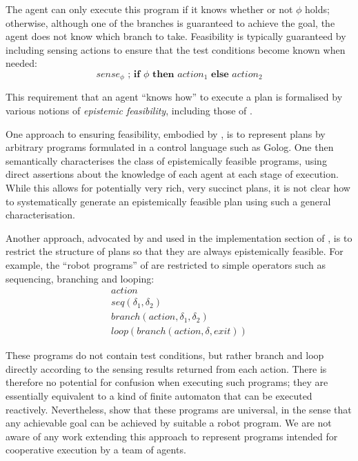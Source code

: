The agent can only execute this program if it knows whether or not
$\phi$ holds; otherwise, although one of the branches is guaranteed
to achieve the goal, the agent does not know which branch to take.
Feasibility is typically guaranteed by including sensing actions to
ensure that the test conditions become known when needed:\[
sense_{\phi}\,\,;\,\mathbf{if\,}\,\phi\,\,\mathbf{then}\,\, action_{1}\,\,\mathbf{else\,}\, action_{2}\]


This requirement that an agent {}``knows how'' to execute a plan
is formalised by various notions of \emph{epistemic feasibility},
including those of \citep{levesque98what_robots_can_do,levesque00knowing_how,Lesperance01epi_feas_casl,giacomo04sem_delib_indigolog,baier06programs_that_sense}.

One approach to ensuring feasibility, embodied by \citep{levesque00knowing_how,giacomo04sem_delib_indigolog,baier06programs_that_sense},
is to represent plans by arbitrary programs formulated in a control
language such as Golog. One then semantically characterises the class
of epistemically feasible programs, using direct assertions about
the knowledge of each agent at each stage of execution. While this
allows for potentially very rich, very succinct plans, it is not clear
how to systematically generate an epistemically feasible plan using
such a general characterisation.

Another approach, advocated by \citep{levesque96what_is_planning,levesque98what_robots_can_do}
and used in the implementation section of \citep{giacomo04sem_delib_indigolog},
is to restrict the structure of plans so that they are always epistemically
feasible. For example, the {}``robot programs'' of \citep{levesque98what_robots_can_do}
are restricted to simple operators such as sequencing, branching and
looping:\begin{gather*}
action\\
seq(\delta_{1},\delta_{2})\\
branch(action,\delta_{1},\delta_{2})\\
loop(branch(action,\delta,exit))\end{gather*}


These programs do not contain test conditions, but rather branch and
loop directly according to the sensing results returned from each
action. There is therefore no potential for confusion when executing
such programs; they are essentially equivalent to a kind of finite
automaton that can be executed reactively. Nevertheless, \citet{levesque98what_robots_can_do}
show that these programs are universal, in the sense that any achievable
goal can be achieved by suitable a robot program. We are not aware
of any work extending this approach to represent programs intended
for cooperative execution by a team of agents.

